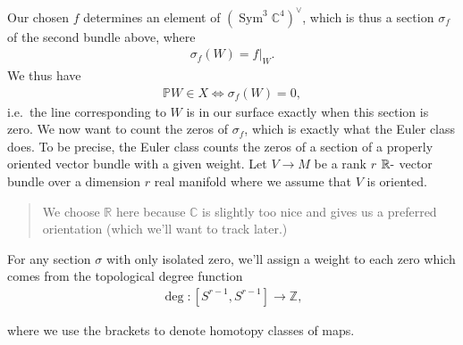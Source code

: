 \begin{center}
\end{center}

Our chosen \(f\) determines an element of
\((\operatorname{Sym}^3 {\mathbb{C}}^4)^\vee\), which is thus a section
\(\sigma_f\) of the second bundle above, where
\begin{align*}
\sigma_f(W) =  {\left.{{f}} \right|_{{W}} } .
\end{align*}
We thus have
\begin{align*}
{\mathbb{P}}W \in X \iff \sigma_f(W) = 0,
\end{align*}
i.e.~the line corresponding to \(W\) is in our surface exactly when this
section is zero. We now want to count the zeros of \(\sigma_f\), which
is exactly what the Euler class does. To be precise, the Euler class
counts the zeros of a section of a properly oriented vector bundle with
a given weight. Let \(V\to M\) be a rank \(r\)
\({\mathbb{R}}{\hbox{-}}\) vector bundle over a dimension \(r\) real
manifold where we assume that \(V\) is oriented.

\begin{quote}
We choose \({\mathbb{R}}\) here because \({\mathbb{C}}\) is slightly too
nice and gives us a preferred orientation (which we'll want to track
later.)
\end{quote}

For any section \(\sigma\) with only isolated zero, we'll assign a
weight to each zero which comes from the topological degree function
\begin{align*}
\deg: [S^{r-1}, S^{r-1}] \to {\mathbb{Z}},
\end{align*}

where we use the brackets to denote homotopy classes of maps.

